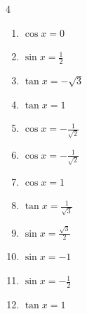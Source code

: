 \begin{multicols}{4}
\begin{enumerate}
  \item $\displaystyle \cos{x}  = 0$


  \item $\displaystyle \sin{x}  = \frac{1}{2}$


  \item $\displaystyle \tan{x}  = -\sqrt{3}$


  \item $\displaystyle \tan{x}  = 1$


  \item $\displaystyle \cos{x}  = -\frac{1}{\sqrt{2}}$


  \item $\displaystyle \cos{x}  = -\frac{1}{\sqrt{2}}$


  \item $\displaystyle \cos{x}  = 1$


  \item $\displaystyle \tan{x}  = \frac{1}{\sqrt{3}}$


  \item $\displaystyle \sin{x}  = \frac{\sqrt{3}}{2}$


  \item $\displaystyle \sin{x}  = -1$


  \item $\displaystyle \sin{x}  = -\frac{1}{2}$


\columnbreak %

  \item $\displaystyle \tan{x}  = 1$


\end{enumerate}
\end{multicols}
